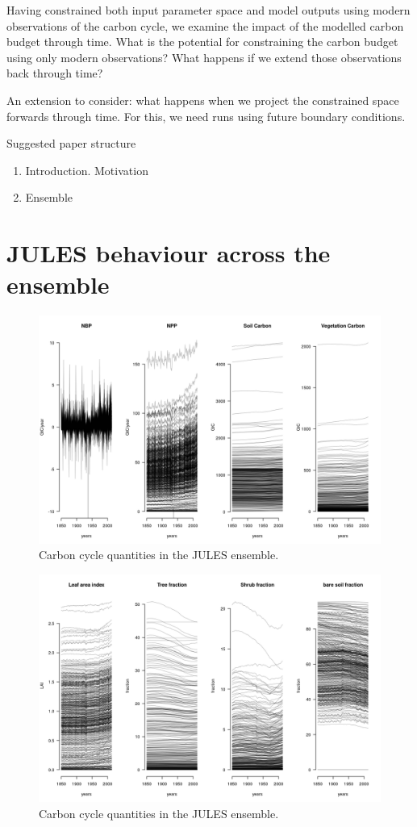 \documentclass[gmd, manuscript]{copernicus}
\begin{document}
Having constrained both input parameter space and model outputs using modern observations of the carbon cycle, we examine the impact of the modelled carbon budget through time. What is the potential for constraining the carbon budget using only modern observations? What happens if we extend those observations back through time?

An extension to consider: what happens when we project the constrained space forwards through time. For this, we need runs using future boundary conditions.

Suggested paper structure
\begin{enumerate}
    \item Introduction. Motivation
    \item Ensemble
\end{enumerate}



\section{JULES behaviour across the ensemble}

%
\begin{figure}[t]
\includegraphics[width=12cm]{./graphics/plot-carbon-cycle-timeseries-primary-1.png}
\caption{Carbon cycle quantities in the JULES ensemble.}
\end{figure}

%
\begin{figure}[t]
\includegraphics[width=12cm]{./graphics/plot-carbon-cycle-timeseries-secondary-1.png}
\caption{Carbon cycle quantities in the JULES ensemble.}
\end{figure}
\end{document}
